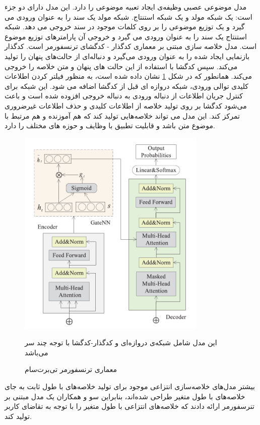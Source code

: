 مدل موضوعی عصبی  وظیفه‌ی ایجاد تعبیه موضوعی را دارد. این مدل دارای دو جزء است: یک شبکه مولد و یک شبکه استنتاج.
شبکه مولد یک سند را به عنوان ورودی می گیرد و یک توزیع موضوعی را بر روی کلمات موجود در سند خروجی می دهد.
شبکه استنتاج یک سند را به عنوان ورودی می گیرد و خروجی آن پارامترهای توزیع موضوع است. 
مدل خلاصه سازی مبتنی بر معماری کدگذار - کدگشای ترنسفورمر است. کدگذار بازنمایی ایجاد شده را به عنوان ورودی می‌گیرد و دنباله‌ای از حالت‌های پنهان را تولید می‌کند. سپس کدگشا با استفاده از این حالت های پنهان و متن خلاصه را خروجی می‌کند. همانطور که در شکل 
\ref{fig:tBert_transformer}
نشان داده شده است، به منظور فیلتر کردن اطلاعات کلیدی توالی ورودی، شبکه دروازه ای قبل از کدگشا اضافه می شود.
این شبکه برای کنترل جریان اطلاعات از دنباله ورودی به دنباله خروجی افزوده شده است و باعث می‌شود کدگشا بر روی تولید خلاصه از اطلاعات کلیدی و حذف اطلاعات غیرضروری تمرکز کند. این مدل می تواند خلاصه‌هایی تولید کند که هم آموزنده و هم مرتبط با موضوع متن باشد و قابلیت تطبیق با وظایف و حوزه های مختلف را دارد.
 \begin{figure}[!h]
	\begin{center}
		\includegraphics[height=10cm]{tbertsum_transformer.png}
	\end{center}
	\caption{   معماری ترنسفورمر تی‌برت‌سام \cite{Ma2022TBERTSumTT}}
	\label{fig:tBert_transformer}
	\medskip
	\small
	\centerline{	این مدل شامل شبکه‌ی دروازه‌ای و کدگذار-کدگشا با توجه چند سر می‌باشد\cite{Ma2022TBERTSumTT}}
	
\end{figure}

 بیشتر مدل‌های خلاصه‌سازی انتزاعی موجود برای تولید خلاصه‌های با طول ثابت به جای خلاصه‌های با طول متغیر طراحی شده‌اند، بنابراین سو
  و همکاران یک مدل مبتنی بر تنرسفورمر ارائه دادند که خلاصه‌های انتزاعی با طول متغیر را با توجه به تقاضای کاربر تولید کند. 

